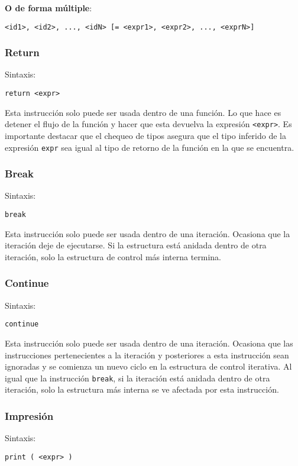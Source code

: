 \documentclass[12pt, spanish]{report}
\begin{document}
\textbf{O de forma m\'ultiple}:
\begin{verbatim}
<id1>, <id2>, ..., <idN> [= <expr1>, <expr2>, ..., <exprN>]
\end{verbatim}

\subsubsection{Return}
\label{sec:return}
Sintaxis:
\begin{verbatim}
return <expr>
\end{verbatim}

Esta instrucci\'on solo puede ser usada dentro de una funci\'on. Lo
que hace es detener el flujo de la funci\'on y hacer que esta devuelva
la expresi\'on \texttt{<expr>}. Es importante destacar que el chequeo
de tipos asegura que el tipo inferido de la expresión \texttt{expr}
sea igual al tipo de retorno de la función en la que se encuentra.

\subsubsection{Break}
\label{sec:return}
Sintaxis:
\begin{verbatim}
break
\end{verbatim}

Esta instrucci\'on solo puede ser usada dentro de una
iteraci\'on. Ocasiona que la iteraci\'on deje de ejecutarse.
Si la estructura est\'a anidada dentro de otra iteraci\'on,
solo la estructura de control m\'as interna termina.

\subsubsection{Continue}
\label{sec:return}
Sintaxis:
\begin{verbatim}
continue
\end{verbatim}

Esta instrucci\'on solo puede ser usada dentro de una
iteraci\'on. Ocasiona que las instrucciones pertenecientes a la
iteraci\'on y posteriores a esta instrucci\'on sean ignoradas y se
comienza un nuevo ciclo en la estructura de control iterativa.  Al
igual que la instrucci\'on \texttt{break}, si la iteraci\'on est\'a
anidada dentro de otra iteraci\'on, solo la estructura m\'as interna
se ve afectada por esta instrucci\'on.

\subsubsection{Impresi\'on}
Sintaxis:
\begin{verbatim}
print ( <expr> )
\end{verbatim}
\end{document}

